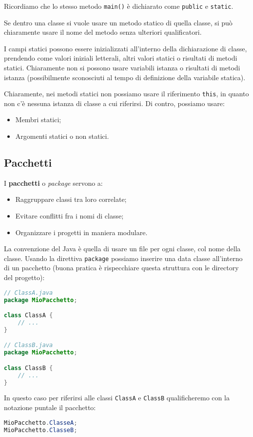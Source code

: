 \documentclass[a4paper,11pt]{article}
\begin{document}
Ricordiamo che lo stesso metodo \lstinline|main()| è dichiarato come \lstinline|public| e \lstinline|static|.

Se dentro una classe si vuole usare un metodo statico di quella classe, si può chiaramente usare il nome del metodo senza ulteriori qualificatori.

I campi statici possono essere inizializzati all'interno della dichiarazione di classe, prendendo come valori iniziali letterali, altri valori statici o risultati di metodi statici.
Chiaramente non si possono usare variabili istanza o risultati di metodi istanza (possibilmente sconosciuti al tempo di definizione della variabile statica).

Chiaramente, nei metodi statici non possiamo usare il riferimento \lstinline|this|, in quanto non c'è nessuna istanza di classe a cui riferirsi.
Di contro, possiamo usare:
\begin{itemize}
	\item Membri statici;
	\item Argomenti statici o non statici.
\end{itemize}

\subsection{Pacchetti}
I \textbf{pacchetti} o \textit{package} servono a:
\begin{itemize}
	\item Raggruppare classi tra loro correlate;
	\item Evitare conflitti fra i nomi di classe;
	\item Organizzare i progetti in maniera modulare.
\end{itemize}

La convenzione del Java è quella di usare un file per ogni classe, col nome della classe.
Usando la direttiva \lstinline|package| possiamo inserire una data classe all'interno di un pacchetto (buona pratica è rispecchiare questa struttura con le directory del progetto):
\begin{lstlisting}[language=java, style=codestyle]	
// ClassA.java
package MioPacchetto;

class ClassA {
	// ...
}

// ClassB.java
package MioPacchetto;

class ClassB {
	// ...
}
\end{lstlisting}

In questo caso per riferirsi alle classi \lstinline|ClassA| e \lstinline|ClassB| qualificheremo con la notazione puntale il pacchetto:
\begin{lstlisting}[language=java, style=codestyle]	
MioPacchetto.ClasseA;
MioPacchetto.ClasseB;
\end{lstlisting}
\end{document}
